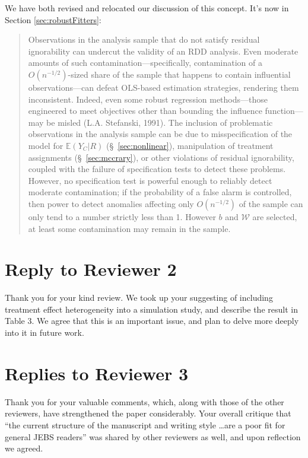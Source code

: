 \documentclass[12pt]{article}
\newcommand{\EE}{\mathbb{E}}
\begin{document}
\begin{itemize}
\begin{itemize}
   We have both revised and relocated our discussion of this
   concept.  It's now in Section \ref{sec:robustFitters}:
   \begin{quote}
Observations in the analysis sample that do not satisfy residual
ignorability %
 can undercut the validity of an RDD analysis.
Even moderate amounts of such contamination---specifically, contamination of
a $O(n^{-1/2})$-sized
share of the sample that happens to contain influential
observations---can defeat OLS-based estimation strategies, rendering
them inconsistent.
Indeed, even some robust regression methods---those engineered to meet
objectives other than bounding the influence function---may be misled
(L.A. Stefanski, 1991).
The inclusion of problematic observations in the analysis sample can
be due to misspecification of the model for $\EE (Y_{C}|R)$
(\S~\ref{sec:nonlinear}), manipulation of treatment assignments
(\S~\ref{sec:mccrary}), or other violations of residual ignorability,
coupled with the failure of specification tests to detect these problems.
However, no specification test is powerful enough
to reliably detect moderate contamination; if the probability of a 
false alarm is controlled, then power to detect anomalies
affecting only $O(n^{-1/2})$ of the sample can only tend to a number
strictly less than 1.
However $b$ and $\mathcal{W}$ are selected, at least some
contamination may remain in the sample.
   \end{quote}
   
\end{itemize}
\end{itemize}

\section{Reply to Reviewer 2}

Thank you for your kind review. We took up your suggesting of
including treatment effect heterogeneity into a simulation study,
and describe the result in Table 3. We agree that this is an important
issue, and plan to delve more deeply into it in future work.



\section{Replies to Reviewer 3}
Thank you for your valuable comments, which, along with those of the
other reviewers, have strengthened the paper considerably. Your
overall critique that ``the current structure of the manuscript
and writing style \dots are a poor fit for general JEBS readers'' was
shared by other reviewers as well, and upon reflection we agreed.
\end{document}
